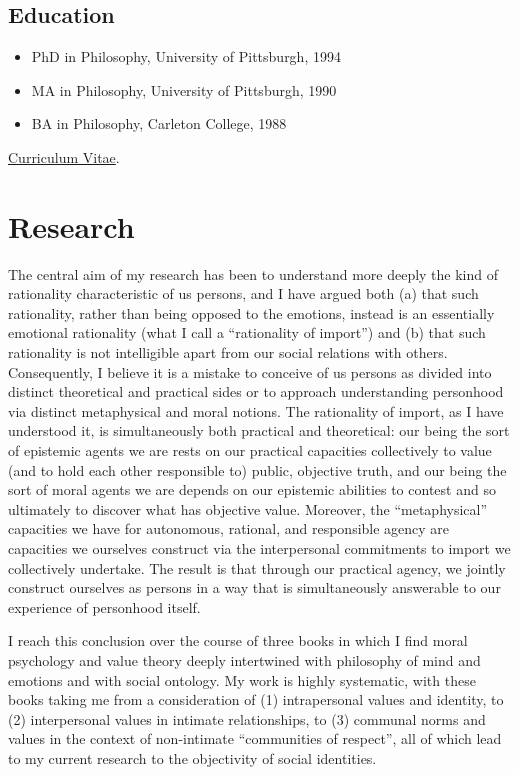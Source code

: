 \documentclass[%
  11pt,%
]{article}
\begin{document}
\subsection{Education}

\begin{itemize}
  \item PhD in Philosophy, University of Pittsburgh, 1994
  \item MA in Philosophy, University of Pittsburgh, 1990
  \item BA in Philosophy, Carleton College, 1988
\end{itemize}

\noindent\href{https://drive.google.com/file/d/1-8fjo2F9EzgfDyYo_WSTYhaU-xrDNU8P/view}{Curriculum Vitae}.

\section{Research}

The central aim of my research has been to understand more deeply the kind of rationality characteristic of us persons, and I have argued both (a) that such rationality, rather than being opposed to the emotions, instead is an essentially emotional rationality (what I call a \enquote{rationality of import}) and (b) that such rationality is not intelligible apart from our social relations with others. Consequently, I believe it is a mistake to conceive of us persons as divided into distinct theoretical and practical sides or to approach understanding personhood via distinct metaphysical and moral notions. The rationality of import, as I have understood it, is simultaneously both practical and theoretical: our being the sort of epistemic agents we are rests on our practical capacities collectively to value (and to hold each other responsible to) public, objective truth, and our being the sort of moral agents we are depends on our epistemic abilities to contest and so ultimately to discover what has objective value. Moreover, the \enquote{metaphysical} capacities we have for autonomous, rational, and responsible agency are capacities we ourselves construct via the interpersonal commitments to import we collectively undertake. The result is that through our practical agency, we jointly construct ourselves as persons in a way that is simultaneously answerable to our experience of personhood itself.

I reach this conclusion over the course of three books in which I find moral psychology and value theory deeply intertwined with philosophy of mind and emotions and with social ontology. My work is highly systematic, with these books taking me from a consideration of (1) intrapersonal values and identity, to (2) interpersonal values in intimate relationships, to (3) communal norms and values in the context of non-intimate \enquote{communities of respect}, all of which lead to my current research to the objectivity of social identities.
\end{document}
